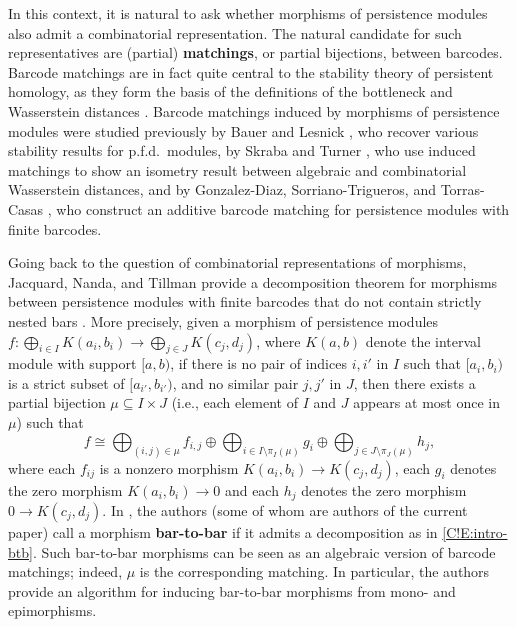 In this context, it is natural to ask whether morphisms of persistence modules also admit a combinatorial representation. The natural candidate for such representatives are (partial) \textbf{matchings}, or partial bijections, between barcodes. Barcode matchings are in fact quite central to the stability theory of persistent homology, as they form the basis of the definitions of the bottleneck and Wasserstein distances \cite[Section VIII.2]{EdelsbrunnerHarer2010}. Barcode matchings induced by morphisms of persistence modules were studied previously by Bauer and Lesnick \cite{BauerLesnick2015,BauerLesnick2020}, who recover various stability results for p.f.d.\ modules, by Skraba and Turner \cite{SkrabaTurner2023}, who use induced matchings to show an isometry result between algebraic and combinatorial Wasserstein distances, and by Gonzalez-Diaz, Sorriano-Trigueros, and Torras-Casas \cite{gonzalez2021partial,GST2025}, who construct an additive barcode matching for persistence modules with finite barcodes.

Going back to the question of combinatorial representations of morphisms, Jacquard, Nanda, and Tillman provide a decomposition theorem for morphisms between persistence modules with finite barcodes that do not contain strictly nested bars \cite[Theorem 5.3]{JNT2023}. More precisely, given a morphism of persistence modules $f \colon \bigoplus_{i \in I} K(a_i, b_i) \to \bigoplus_{j \in J} K(c_j, d_j)$, where $K(a, b)$ denote the interval module with support $[a, b)$, if there is no pair of indices $i, i'$ in $I$ such that $[a_i, b_i)$ is a strict subset of $[a_{i'}, b_{i'})$, and no similar pair $j, j'$ in $J$, then there exists a partial bijection $\mu \subseteq I \times J$ (i.e., each element of $I$ and $J$ appears at most once in $\mu$) such that
\begin{equation}
\label{C!E:intro-btb}
  f \cong \bigoplus_{(i, j) \in \mu} f_{i, j} \oplus \bigoplus_{i \in I \setminus \pi_I(\mu)} g_i \oplus \bigoplus_{j \in J \setminus \pi_J(\mu)} h_j , 
\end{equation}
where each $f_{ij}$ is a nonzero morphism $K(a_i, b_i) \to K(c_j, d_j)$, each $g_i$ denotes the zero morphism $K(a_i, b_i) \to 0$ and each $h_j$ denotes the zero morphism $0 \to K(c_j, d_j)$. In \cite{AGRS2025}, the authors (some of whom are authors of the current paper) call a morphism \textbf{bar-to-bar} if it admits a decomposition as in \eqref{C!E:intro-btb}. Such bar-to-bar morphisms can be seen as an algebraic version of barcode matchings; indeed, $\mu$ is the corresponding matching. In particular, the authors provide an algorithm for inducing bar-to-bar morphisms from mono- and epimorphisms.

